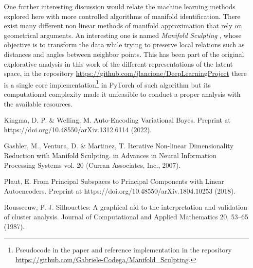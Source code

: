 \documentclass[twocolumn,gsifonts,twoside]{gsipaper}
\begin{document}
One further interesting discussion would relate the machine learning methods explored here with more controlled algorithms of manifold identification. There exist many different non linear methods of manifold approximation that rely on geometrical arguments. An interesting one is named \emph{Manifold Sculpting} \cite{Gashler2007}, whose objective is to transform the data while trying to preserve local relations such as distances and angles between neighbor points. This has been part of the original explorative analysis in this work of the different representations of the latent space, in the repository \url{https://github.com/jlancione/DeepLearningProject}
there is a single core implementation\footnote{Pseudocode in the paper \cite{Gashler2007} and reference implementation in the repository \url{https://github.com/Gabriele-Codega/Manifold_Sculpting}.
} in PyTorch of such algorithm but its computational complexity made it unfeasible to conduct a proper analysis with the available resources. 



%  

\begin{thebibliography}{99}
  Kingma, D. P. \& Welling, M. Auto-Encoding Variational Bayes. Preprint at https://doi.org/10.48550/arXiv.1312.6114 (2022).

  Gashler, M., Ventura, D. \& Martinez, T. Iterative Non-linear Dimensionality Reduction with Manifold Sculpting. in Advances in Neural Information Processing Systems vol. 20 (Curran Associates, Inc., 2007).

  Plaut, E. From Principal Subspaces to Principal Components with Linear Autoencoders. Preprint at https://doi.org/10.48550/arXiv.1804.10253 (2018).

  Rousseeuw, P. J. Silhouettes: A graphical aid to the interpretation and validation of cluster analysis. Journal of Computational and Applied Mathematics 20, 53–65 (1987).
\end{thebibliography}
\end{document}
